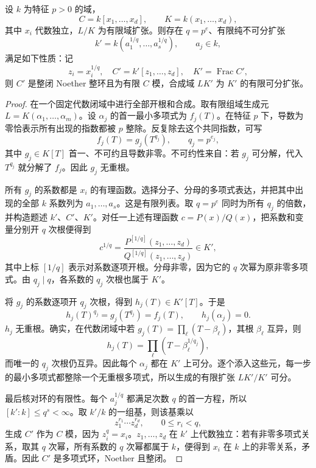 \begin{lemma}\label{g5:lem:finite-coefficient-root-extension}
	设 \(k\) 为特征 \(p>0\) 的域，
	\[
		C=k[x_1,\ldots,x_d],\qquad K=k(x_1,\ldots,x_d),
	\]
	其中 \(x_i\) 代数独立，\(L/K\) 为有限域扩张。则存在 \(q=p^e\)、有限纯不可分扩张
	\[
		k'=k(a_1^{1/q},\ldots,a_s^{1/q}),\qquad a_j\in k,
	\]
	满足如下性质：记
	\[
		z_i=x_i^{1/q},\quad C'=k'[z_1,\ldots,z_d],
		\quad K'=\operatorname{Frac}C',
	\]
	则 \(C'\) 是整闭 Noether 整环且为有限 \(C\) 模，合成域 \(LK'\) 为 \(K'\) 的有限可分扩张。
\end{lemma}
\begin{proof}
	在一个固定代数闭域中进行全部开根和合成。取有限组域生成元 \(L=K(\alpha_1,\ldots,\alpha_m)\)。设 \(\alpha_j\) 的首一最小多项式为 \(f_j(T)\)。在特征 \(p\) 下，导数为零恰表示所有出现的指数都被 \(p\) 整除。反复除去这个共同指数，可写
	\[
		f_j(T)=g_j(T^{q_j}),\qquad q_j=p^{e_j},
	\]
	其中 \(g_j\in K[T]\) 首一、不可约且导数非零。不可约性来自：若 \(g_j\) 可分解，代入 \(T^{q_j}\) 就分解了 \(f_j\)。因此 \(g_j\) 无重根。

	所有 \(g_j\) 的系数都是 \(x_i\) 的有理函数。选择分子、分母的多项式表达，并把其中出现的全部 \(k\) 系数列为 \(a_1,\ldots,a_s\)。这是有限列表。取 \(q=p^e\) 同时为所有 \(q_j\) 的倍数，并构造题述 \(k'\)、\(C'\)、\(K'\)。对任一上述有理函数 \(c=P(x)/Q(x)\)，把系数和变量分别开 \(q\) 次根便得到
	\[
		c^{1/q}
		=\frac{P^{[1/q]}(z_1,\ldots,z_d)}
		{Q^{[1/q]}(z_1,\ldots,z_d)}\in K',
	\]
	其中上标 \([1/q]\) 表示对系数逐项开根。分母非零，因为它的 \(q\) 次幂为原非零多项式。由 \(q_j\mid q\)，各系数的 \(q_j\) 次根也属于 \(K'\)。

	将 \(g_j\) 的系数逐项开 \(q_j\) 次根，得到 \(h_j(T)\in K'[T]\)。于是
	\[
		h_j(T)^{q_j}=g_j(T^{q_j})=f_j(T),
		\qquad h_j(\alpha_j)=0.
	\]
	\(h_j\) 无重根。确实，在代数闭域中若
	\(g_j(T)=\prod_\ell(T-\beta_\ell)\)，其根 \(\beta_\ell\) 互异，则
	\[
		h_j(T)=\prod_\ell(T-\beta_\ell^{1/q_j}),
	\]
	而唯一的 \(q_j\) 次根仍互异。因此每个 \(\alpha_j\) 都在 \(K'\) 上可分。逐个添入这些元，每一步的最小多项式都整除一个无重根多项式，所以生成的有限扩张 \(LK'/K'\) 可分。

	最后核对环的有限性。每个 \(a_j^{1/q}\) 都满足次数 \(q\) 的首一方程，所以 \([k':k]\leq q^s<\infty\)。取 \(k'/k\) 的一组基，则该基乘以
	\[
		z_1^{r_1}\cdots z_d^{r_d},\qquad 0\leq r_i<q,
	\]
	生成 \(C'\) 作为 \(C\) 模，因为 \(z_i^q=x_i\)。\(z_1,\ldots,z_d\) 在 \(k'\) 上代数独立：若有非零多项式关系，取其 \(q\) 次幂，所有系数的 \(q\) 次幂都属于 \(k\)，便得到 \(x_i\) 在 \(k\) 上的非零关系，矛盾。因此 \(C'\) 是多项式环，Noether 且整闭。
\end{proof}


